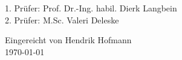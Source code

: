 \documentclass[10pt,a4paper,bibliography=totocnumbered,listof=totocnumbered]{scrartcl}
\begin{document}
	\normalsize
		\begin{minipage}[t]{0.7\textwidth}
		\begin{addmargin}[1cm]{1cm}
			\begin{flushleft} %
			 1. Prüfer: Prof. Dr.-Ing. habil. Dierk Langbein \\ 
			 2. Prüfer: M.Sc. Valeri Deleske
					
					
				\end{flushleft}
		\end{addmargin}
		
		\end{minipage}
		\begin{minipage}[t]{0.3\textwidth}
			\begin{addmargin}[1cm]{1cm}
			\begin{flushright} %
				Eingereicht von Hendrik Hofmann \\{\today}
			\end{flushright}
			\end{addmargin}
		\end{minipage}

\pagebreak
\newpage
\thispagestyle{empty}



\renewcommand{\cfttabpresnum}{Tab. }
\renewcommand{\cftfigpresnum}{Abb. }
\settowidth{\cfttabnumwidth}{Abb. 10\quad}
\settowidth{\cftfignumwidth}{Abb. 10\quad}

\singlespacing
{}
\renewcommand{\contentsname}{I Inhaltsverzeichnis}

\addtocounter{section}{1}
\tableofcontents
\pagebreak

\pagebreak



\pagebreak
\end{document}
